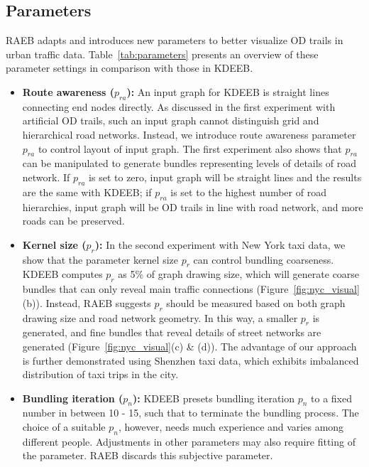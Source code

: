 \subsection{Parameters}
\label{ssec:parameters}

RAEB adapts and introduces new parameters to better visualize OD trails in urban traffic data.
Table~\ref{tab:parameters} presents an overview of these parameter settings in comparison with those in KDEEB.

\begin{itemize}

\item
\textbf{Route awareness ($p_{ra}$):}
An input graph for KDEEB is straight lines connecting end nodes directly.
As discussed in the first experiment with artificial OD trails, such an input graph cannot distinguish grid and hierarchical road networks.
Instead, we introduce route awareness parameter $p_{ra}$ to control layout of input graph.
The first experiment also shows that $p_{ra}$ can be manipulated to generate bundles representing levels of details of road network.
If $p_{ra}$ is set to zero, input graph will be straight lines and the results are the same with KDEEB;
if $p_{ra}$ is set to the highest number of road hierarchies, input graph will be OD trails in line with road network, and more roads can be preserved.

\vspace{1mm}
\item
\textbf{Kernel size ($p_{r}$):}
In the second experiment with New York taxi data, we show that the parameter kernel size $p_r$ can control bundling coarseness.
KDEEB computes $p_{r}$ as 5\% of graph drawing size, which will generate coarse bundles that can only reveal main traffic connections (Figure~\ref{fig:nyc_visual}(b)).
Instead, RAEB suggests $p_{r}$ should be measured based on both graph drawing size and road network geometry.
In this way, a smaller $p_{r}$ is generated, and fine bundles that reveal details of street networks are generated (Figure~\ref{fig:nyc_visual}(c) \& (d)).
The advantage of our approach is further demonstrated using Shenzhen taxi data, which exhibits imbalanced distribution of taxi trips in the city.

\vspace{1mm}
\item
\textbf{Bundling iteration ($p_{n}$):}
KDEEB presets bundling iteration $p_{n}$ to a fixed number in between 10 - 15, such that to terminate the bundling process.
The choice of a suitable $p_{n}$, however, needs much experience and varies among different people. 
Adjustments in other parameters may also require fitting of the parameter.
RAEB discards this subjective parameter.


\end{itemize}
